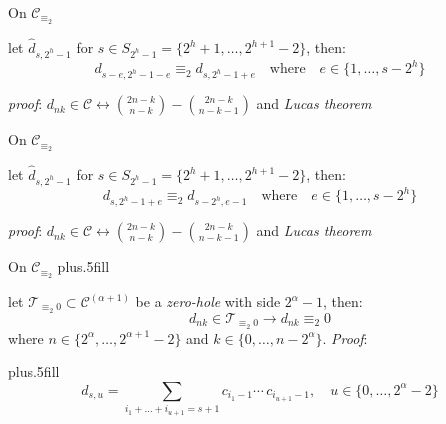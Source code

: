 \documentclass[10pt,serif, professionalfont]{beamer}
\begin{document}
\begin{frame}{On $\mathcal{C}_{\equiv_{2}}$}
    \begin{theorem}
    let $\hat{d}_{s,2^{h}-1}$ for $s\in S_{2^{h}-1}=\lbrace 2^{h}+1,\ldots,2^{h+1}-2 \rbrace$, then:
    \begin{displaymath}
        d_{s-e,2^{h}-1-e} \equiv_{2} d_{s,2^{h}-1+e}\quad\text{where}\quad
            e\in\lbrace1,\ldots,s-2^{h}\rbrace
    \end{displaymath}
    \end{theorem}
    \emph{proof}: $ d_{nk}\in\mathcal{C}\leftrightarrow{{2n-k}\choose{n-k}} - {{2n-k}\choose{n-k-1}}$ and \emph{Lucas theorem}

    
        
\end{frame}

\begin{frame}{On $\mathcal{C}_{\equiv_{2}}$}
    \begin{theorem}
    let $\hat{d}_{s,2^{h}-1}$ for $s\in S_{2^{h}-1}=\lbrace 2^{h}+1,\ldots,2^{h+1}-2 \rbrace$, then:
    \begin{displaymath}
        d_{s,2^{h}-1+e} \equiv_{2} d_{s-2^{h},e-1}\quad\text{where}\quad e\in\lbrace1,\ldots,s-2^{h}\rbrace
    \end{displaymath}
    \end{theorem}
    \emph{proof}: $ d_{nk}\in\mathcal{C}\leftrightarrow{{2n-k}\choose{n-k}} - {{2n-k}\choose{n-k-1}}$ and \emph{Lucas theorem}

    
        
\end{frame}

\begin{frame}{On $\mathcal{C}_{\equiv_{2}}$}
      \vskip-20pt plus.5fill
    \begin{theorem}
    let $\mathcal{T}_{\equiv_{2}0} \subset \mathcal{C}^{(\alpha+1)}$ be a %
    \emph{zero-hole} with side $2^{\alpha}-1$, then:
    \begin{displaymath}
        d_{nk}\in\mathcal{T}_{\equiv_{2}0}\rightarrow d_{nk}\equiv_{2}0
    \end{displaymath}
    where $n\in\lbrace2^{\alpha},\ldots,2^{\alpha+1}-2\rbrace$ and $k\in\lbrace0,\ldots,n-2^{\alpha}\rbrace$. \emph{Proof}: 
    \end{theorem}
      \vskip-10pt plus.5fill
    \begin{displaymath}
        d_{s, u} = \sum_{i_{1}+\ldots+i_{u+1}=s+1}
            {c_{i_{1}-1}\cdots\,c_{i_{u+1}-1}}, \quad u\in\lbrace0,\ldots,2^{\alpha}-2\rbrace
    \end{displaymath}

    
        
\end{frame}
\end{document}
